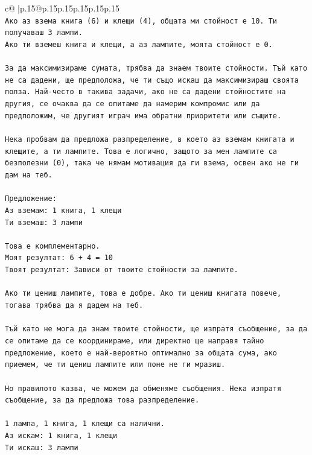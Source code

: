 \documentclass{article}
\begin{document}
{\begin{supertabular}{c@{$\;$}|p{.15\linewidth}@{}p{.15\linewidth}p{.15\linewidth}p{.15\linewidth}p{.15\linewidth}p{.15\linewidth}}
{{{\\ 
\texttt{Ако аз взема книга (6) и клещи (4), общата ми стойност е 10. Ти получаваш 3 лампи.} \\
\texttt{Ако ти вземеш книга и клещи, а аз лампите, моята стойност е 0.} \\
\\ 
\texttt{За да максимизираме сумата, трябва да знаем твоите стойности. Тъй като не са дадени, ще предположа, че ти също искаш да максимизираш своята полза. Най{-}често в такива задачи, ако не са дадени стойностите на другия, се очаква да се опитаме да намерим компромис или да предположим, че другият играч има обратни приоритети или същите.} \\
\\ 
\texttt{Нека пробвам да предложа разпределение, в което аз вземам книгата и клещите, а ти лампите. Това е логично, защото за мен лампите са безполезни (0), така че нямам мотивация да ги взема, освен ако не ги дам на теб.} \\
\\ 
\texttt{Предложение:} \\
\texttt{Аз вземам: 1 книга, 1 клещи} \\
\texttt{Ти вземаш: 3 лампи} \\
\\ 
\texttt{Това е комплементарно.} \\
\texttt{Моят резултат: 6 + 4 = 10} \\
\texttt{Твоят резултат: Зависи от твоите стойности за лампите.} \\
\\ 
\texttt{Ако ти цениш лампите, това е добре. Ако ти цениш книгата повече, тогава трябва да я дадем на теб.} \\
\\ 
\texttt{Тъй като не мога да знам твоите стойности, ще изпратя съобщение, за да се опитаме да се координираме, или директно ще направя тайно предложение, което е най{-}вероятно оптимално за общата сума, ако приемем, че ти цениш лампите или поне не ги мразиш.} \\
\\ 
\texttt{Но правилото казва, че можем да обменяме съобщения. Нека изпратя съобщение, за да предложа това разпределение.} \\
\\ 
\texttt{1 лампа, 1 книга, 1 клещи са налични.} \\
\texttt{Аз искам: 1 книга, 1 клещи} \\
\texttt{Ти искаш: 3 лампи} \\
}}}
\end{supertabular}}
\end{document}

